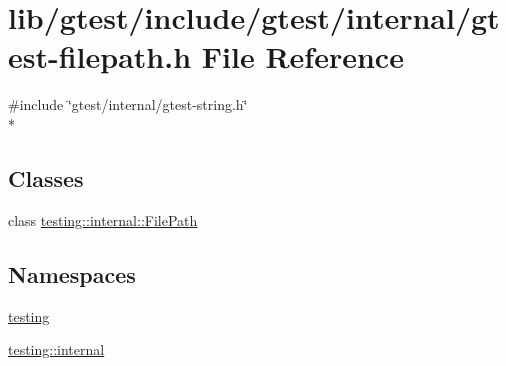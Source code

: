 \hypertarget{gtest-filepath_8h}{\section{lib/gtest/include/gtest/internal/gtest-\/filepath.h File Reference}
\label{gtest-filepath_8h}
}
{\ttfamily \#include \char`\"{}gtest/internal/gtest-\/string.\-h\char`\"{}}\\*
\subsection*{Classes}
\begin{DoxyCompactItemize}
\item 
class \hyperlink{classtesting_1_1internal_1_1_file_path}{testing\-::internal\-::\-File\-Path}
\end{DoxyCompactItemize}
\subsection*{Namespaces}
\begin{DoxyCompactItemize}
\item 
\hyperlink{namespacetesting}{testing}
\item 
\hyperlink{namespacetesting_1_1internal}{testing\-::internal}
\end{DoxyCompactItemize}
